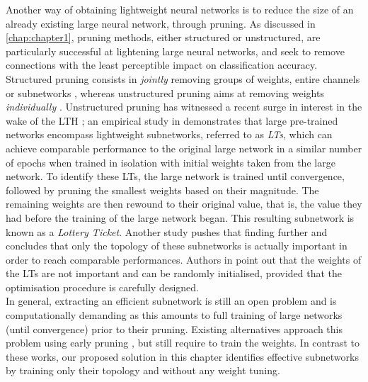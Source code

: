 Another way of obtaining lightweight neural networks is to reduce the size of an
already existing large neural network, through pruning. As discussed in
\cref{chap:chapter1}, pruning methods, either structured or unstructured, are
particularly successful at lightening large neural networks, and seek to remove
connections with the least perceptible impact on classification accuracy.
Structured pruning consists in {\it jointly} removing groups of weights, entire
channels or subnetworks \cite{DBLP:conf/iclr/0022KDSG17,
DBLP:conf/iccv/LiuLSHYZ17}, whereas unstructured pruning aims at removing
weights {\it individually}
\cite{DBLP:conf/nips/HanPTD15,DBLP:journals/corr/HanMD15}.  Unstructured pruning
has witnessed a recent surge in interest in the wake of the \ac{LTH}
\cite{DBLP:conf/iclr/FrankleC19}; an empirical study in
\cite{DBLP:conf/iclr/FrankleC19} demonstrates that large pre-trained networks
encompass lightweight subnetworks, referred to as \textit{\acp{LT}}, which can
achieve comparable performance to the original large network in a similar number
of epochs when trained in isolation with initial weights taken from the large
network. To identify these \acp{LT}, the large network is trained until
convergence, followed by pruning the smallest weights based on their magnitude.
The remaining weights are then rewound to their original value, that is, the
value they had before the training of the large network began. This resulting
subnetwork is known as a \textit{Lottery Ticket}. Another study
\cite{DBLP:conf/iclr/LiuSZHD19} pushes that finding further and concludes that
only the topology of these subnetworks is actually important in order to reach
comparable performances. Authors in \cite{DBLP:conf/iclr/LiuSZHD19} point out
that the weights of the \acp{LT} are not important and can be randomly
initialised, provided that the optimisation procedure is carefully designed.\\

In general, extracting an efficient subnetwork is still an open problem and is
computationally demanding as this amounts to full training of large networks
(until convergence) prior to their pruning. Existing alternatives approach this
problem using early pruning \cite{DBLP:conf/iclr/LeeAT19,
DBLP:conf/iclr/WangZG20,DBLP:conf/nips/TanakaKYG20}, but still require to train
the weights. In contrast to these works, our proposed solution in this chapter
identifies effective subnetworks by training only their topology and without any
weight tuning.\\ 

